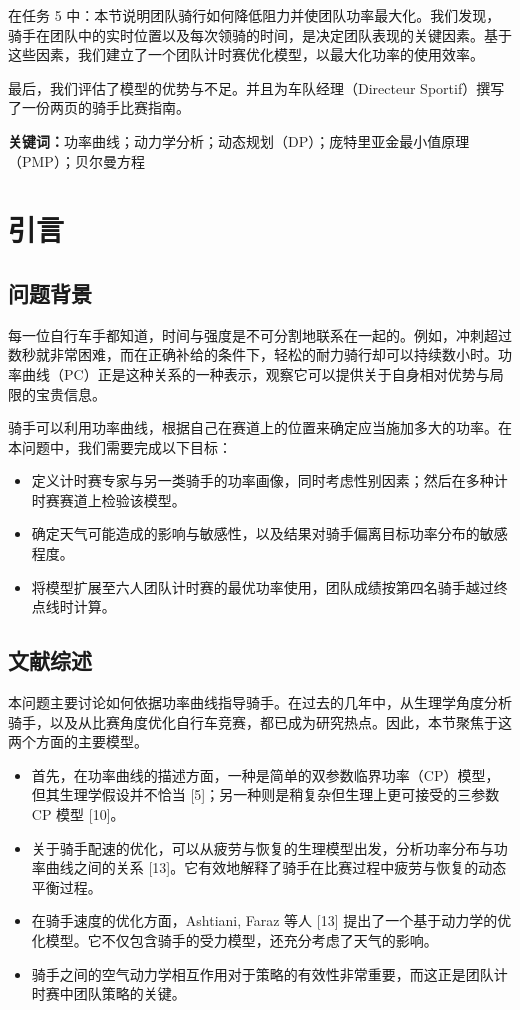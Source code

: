 \documentclass[11pt,a4paper]{ctexart}
\begin{document}
在任务 5 中：本节说明团队骑行如何降低阻力并使团队功率最大化。我们发现，骑手在团队中的实时位置以及每次领骑的时间，是决定团队表现的关键因素。基于这些因素，我们建立了一个团队计时赛优化模型，以最大化功率的使用效率。

最后，我们评估了模型的优势与不足。并且为车队经理（Directeur Sportif）撰写了一份两页的骑手比赛指南。

\vspace{6pt}
\noindent\textbf{关键词：}功率曲线；动力学分析；动态规划（DP）；庞特里亚金最小值原理（PMP）；贝尔曼方程

\newpage
\pagestyle{fancy}

\section{引言}

\subsection{问题背景}

每一位自行车手都知道，时间与强度是不可分割地联系在一起的。例如，冲刺超过数秒就非常困难，而在正确补给的条件下，轻松的耐力骑行却可以持续数小时。功率曲线（PC）正是这种关系的一种表示，观察它可以提供关于自身相对优势与局限的宝贵信息。

骑手可以利用功率曲线，根据自己在赛道上的位置来确定应当施加多大的功率。在本问题中，我们需要完成以下目标：

\begin{itemize}
\item 定义计时赛专家与另一类骑手的功率画像，同时考虑性别因素；然后在多种计时赛赛道上检验该模型。
\item 确定天气可能造成的影响与敏感性，以及结果对骑手偏离目标功率分布的敏感程度。
\item 将模型扩展至六人团队计时赛的最优功率使用，团队成绩按第四名骑手越过终点线时计算。
\end{itemize}

\subsection{文献综述}

本问题主要讨论如何依据功率曲线指导骑手。在过去的几年中，从生理学角度分析骑手，以及从比赛角度优化自行车竞赛，都已成为研究热点。因此，本节聚焦于这两个方面的主要模型。

\begin{itemize}
\item 首先，在功率曲线的描述方面，一种是简单的双参数临界功率（CP）模型，但其生理学假设并不恰当 [5]；另一种则是稍复杂但生理上更可接受的三参数 CP 模型 [10]。
\item 关于骑手配速的优化，可以从疲劳与恢复的生理模型出发，分析功率分布与功率曲线之间的关系 [13]。它有效地解释了骑手在比赛过程中疲劳与恢复的动态平衡过程。
\item 在骑手速度的优化方面，Ashtiani, Faraz 等人 [13] 提出了一个基于动力学的优化模型。它不仅包含骑手的受力模型，还充分考虑了天气的影响。
\item 骑手之间的空气动力学相互作用对于策略的有效性非常重要，而这正是团队计时赛中团队策略的关键。
\end{itemize}
\end{document}
